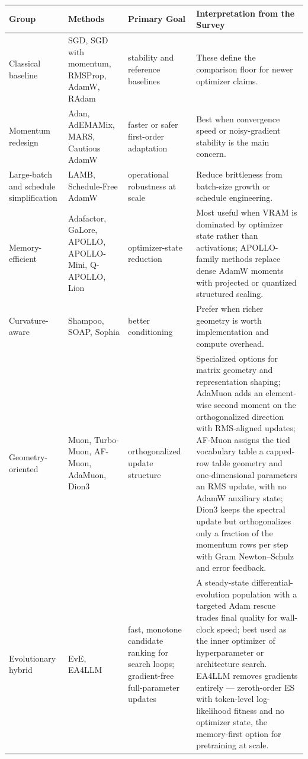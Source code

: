 \small
\begin{longtable}{L{2.5cm}L{3.5cm}L{2.3cm}L{5.0cm}}
\toprule
\textbf{Group} & \textbf{Methods} & \textbf{Primary Goal} & \textbf{Interpretation from the Survey} \\
\midrule
\endhead
Classical baseline & SGD, SGD with momentum, RMSProp, AdamW, RAdam & stability and reference baselines & These define the comparison floor for newer optimizer claims. \\
Momentum redesign & Adan, AdEMAMix, MARS, Cautious AdamW & faster or safer first-order adaptation & Best when convergence speed or noisy-gradient stability is the main concern. \\
Large-batch and schedule simplification & LAMB, Schedule-Free AdamW & operational robustness at scale & Reduce brittleness from batch-size growth or schedule engineering. \\
Memory-efficient & Adafactor, GaLore, APOLLO, APOLLO-Mini, Q-APOLLO, Lion & optimizer-state reduction & Most useful when VRAM is dominated by optimizer state rather than activations; APOLLO-family methods replace dense AdamW moments with projected or quantized structured scaling. \\
Curvature-aware & Shampoo, SOAP, Sophia & better conditioning & Prefer when richer geometry is worth implementation and compute overhead. \\
Geometry-oriented & Muon, Turbo-Muon, AF-Muon, AdaMuon, Dion3 & orthogonalized update structure & Specialized options for matrix geometry and representation shaping; AdaMuon adds an element-wise second moment on the orthogonalized direction with RMS-aligned updates; AF-Muon assigns the tied vocabulary table a capped-row table geometry and one-dimensional parameters an RMS update, with no AdamW auxiliary state; Dion3 keeps the spectral update but orthogonalizes only a fraction of the momentum rows per step with Gram Newton--Schulz and error feedback. \\
Evolutionary hybrid & EvE, EA4LLM & fast, monotone candidate ranking for search loops; gradient-free full-parameter updates & A steady-state differential-evolution population with a targeted Adam rescue trades final quality for wall-clock speed; best used as the inner optimizer of hyperparameter or architecture search. EA4LLM removes gradients entirely --- zeroth-order ES with token-level log-likelihood fitness and no optimizer state, the memory-first option for pretraining at scale. \\
\bottomrule
\end{longtable}
\normalsize
